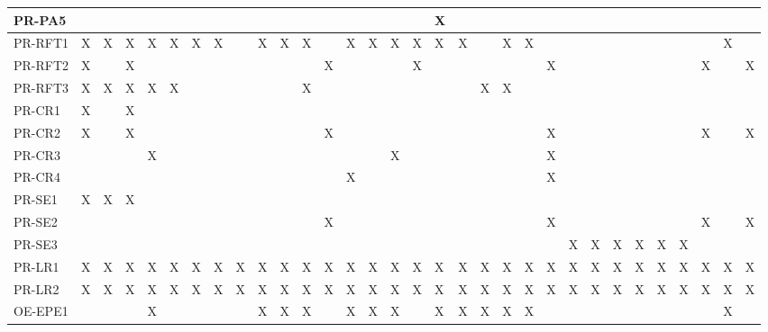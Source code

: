 \documentclass[12pt]{article}
\begin{document}
\begin{table}[H]
{\begin{tabular}{|l|l|l|l|l|l|l|l|l|l|l|l|l|l|l|l|l|l|l|l|l|l|l|l|l|l|l|l|l|l|l|l|}
      PR-PA5 & ~ & ~ & ~ & ~ & ~ & ~ & ~ & ~ & ~ & ~ & ~ & ~ & ~ & ~ & ~ & ~ & X & ~ & ~ & ~ & ~ & ~ & ~ & ~ & ~ & ~ & ~ & ~ & ~ & ~ & ~ \\ \hline
      PR-RFT1 & X & X & X & X & X & X & X & ~ & X & X & X & ~ & X & X & X & X & X & X & ~ & X & X & ~ & ~ & ~ & ~ & ~ & ~ & ~ & ~ & X & ~ \\ \hline
      PR-RFT2 & X & ~ & X & ~ & ~ & ~ & ~ & ~ & ~ & ~ & ~ & X & ~ & ~ & ~ & X & ~ & ~ & ~ & ~ & ~ & X & ~ & ~ & ~ & ~ & ~ & ~ & X & ~ & X \\ \hline
      PR-RFT3 & X & X & X & X & X & ~ & ~ & ~ & ~ & ~ & X & ~ & ~ & ~ & ~ & ~ & ~ & ~ & X & X & ~ & ~ & ~ & ~ & ~ & ~ & ~ & ~ & ~ & ~ & ~ \\ \hline
      PR-CR1 & X & ~ & X & ~ & ~ & ~ & ~ & ~ & ~ & ~ & ~ & ~ & ~ & ~ & ~ & ~ & ~ & ~ & ~ & ~ & ~ & ~ & ~ & ~ & ~ & ~ & ~ & ~ & ~ & ~ & ~ \\ \hline
      PR-CR2 & X & ~ & X & ~ & ~ & ~ & ~ & ~ & ~ & ~ & ~ & X & ~ & ~ & ~ & ~ & ~ & ~ & ~ & ~ & ~ & X & ~ & ~ & ~ & ~ & ~ & ~ & X & ~ & X \\ \hline
      PR-CR3 & ~ & ~ & ~ & X & ~ & ~ & ~ & ~ & ~ & ~ & ~ & ~ & ~ & ~ & X & ~ & ~ & ~ & ~ & ~ & ~ & X & ~ & ~ & ~ & ~ & ~ & ~ & ~ & ~ & ~ \\ \hline
      PR-CR4 & ~ & ~ & ~ & ~ & ~ & ~ & ~ & ~ & ~ & ~ & ~ & ~ & X & ~ & ~ & ~ & ~ & ~ & ~ & ~ & ~ & X & ~ & ~ & ~ & ~ & ~ & ~ & ~ & ~ & ~ \\ \hline
      PR-SE1 & X & X & X & ~ & ~ & ~ & ~ & ~ & ~ & ~ & ~ & ~ & ~ & ~ & ~ & ~ & ~ & ~ & ~ & ~ & ~ & ~ & ~ & ~ & ~ & ~ & ~ & ~ & ~ & ~ & ~ \\ \hline
      PR-SE2 & ~ & ~ & ~ & ~ & ~ & ~ & ~ & ~ & ~ & ~ & ~ & X & ~ & ~ & ~ & ~ & ~ & ~ & ~ & ~ & ~ & X & ~ & ~ & ~ & ~ & ~ & ~ & X & ~ & X \\ \hline
      PR-SE3 & ~ & ~ & ~ & ~ & ~ & ~ & ~ & ~ & ~ & ~ & ~ & ~ & ~ & ~ & ~ & ~ & ~ & ~ & ~ & ~ & ~ & ~ & X & X & X & X & X & X & ~ & ~ & ~ \\ \hline
      PR-LR1 & X & X & X & X & X & X & X & X & X & X & X & X & X & X & X & X & X & X & X & X & X & X & X & X & X & X & X & X & X & X & X \\ \hline
      PR-LR2 & X & X & X & X & X & X & X & X & X & X & X & X & X & X & X & X & X & X & X & X & X & X & X & X & X & X & X & X & X & X & X \\ \hline
      OE-EPE1 & ~ & ~ & ~ & X & ~ & ~ & ~ & ~ & X & X & X & ~ & X & X & X & ~ & X & X & X & X & X & ~ & ~ & ~ & ~ & ~ & ~ & ~ & ~ & X & ~ \\ \hline

\end{tabular}}
\end{table}
\end{document}
